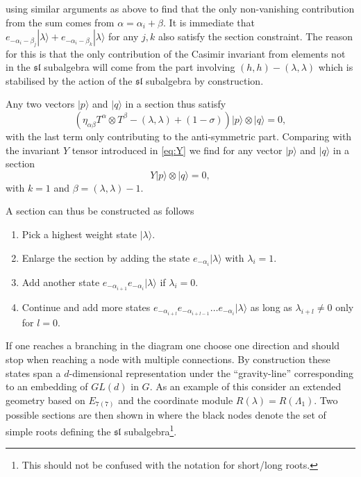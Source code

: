 using similar arguments as above to find that the only non-vanishing contribution from the sum comes from $\alpha=\alpha_i+\beta$. It is immediate that $e_{-\alpha_i-\beta_j}|\lambda\rangle+e_{-\alpha_i-\beta_k}|\lambda\rangle$ for any $j,k$ also satisfy the section constraint. The reason for this is that the only contribution of the Casimir invariant from elements not in the $\mathfrak{sl}$ subalgebra will come from the part involving $(h,h)-(\lambda,\lambda)$ which is stabilised by the action of the $\mathfrak{sl}$ subalgebra by construction. 

Any two vectors $|p\rangle$ and $|q\rangle$ in a section thus satisfy 
\begin{equation}
    \left(\eta_{\alpha\beta}T^\alpha\otimes T^\beta-(\lambda,\lambda)+(1-\sigma)\right)|p\rangle\otimes|q\rangle = 0,
\end{equation}
with the last term only contributing to the anti-symmetric part. Comparing with the invariant $Y$ tensor introduced in \eqref{eq:Y} we find for any vector $|p\rangle$ and $|q\rangle$ in a section 
\begin{equation}
    Y|p\rangle\otimes|q\rangle = 0,
\end{equation}
with $k=1$ and $\beta=(\lambda,\lambda)-1$. 

A section can thus be constructed as follows 
\begin{enumerate}
    \item Pick a highest weight state $|\lambda\rangle$.
    \item Enlarge the section by adding the state $e_{-\alpha_i}|\lambda\rangle$ with $\lambda_i=1$.
    \item Add another state $e_{-\alpha_{i+1}}e_{-\alpha_{i}}|\lambda\rangle$ if $\lambda_i=0$. 
    \item Continue and add more states $e_{-\alpha_{i+l}}e_{-\alpha_{i+l-1}}\ldots e_{-\alpha_{i}}|\lambda\rangle$ as long as $\lambda_{i+l}\neq 0$ only for $l=0$.
\end{enumerate}
If one reaches a branching in the diagram one choose one direction and should stop when reaching a node with multiple connections. By construction these states span a $d$-dimensional representation under the ``gravity-line'' corresponding to an embedding of $GL(d)$ in $G$. As an example of this consider an extended geometry based on $E_{7(7)}$ and the coordinate module $R(\lambda)=R(\Lambda_1)$. Two possible sections are then shown in  where the black nodes denote the set of simple roots defining the $\mathfrak{sl}$ subalgebra\footnote{This should not be confused with the notation for short/long roots.}. 

